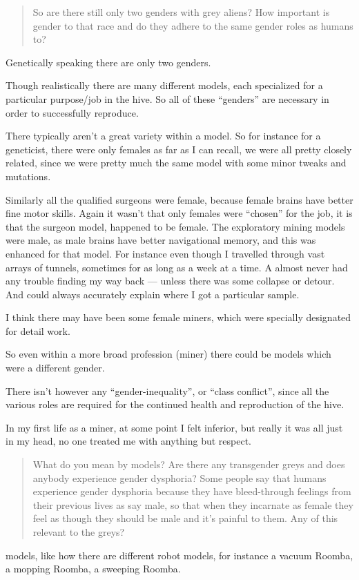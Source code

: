 \blockquote{So are there still only two genders with grey aliens? How important
is gender to that race and do they adhere to the same gender roles as humans
to?}

Genetically speaking there are only two genders.

Though realistically there are many different models, each specialized for a
particular purpose/job in the hive. So all of these ``genders'' are necessary in
order to successfully reproduce.

There typically aren't a great variety within a model. So for instance for a
geneticist, there were only females as far as I can recall, we were all pretty
closely related, since we were pretty much the same model with some minor tweaks
and mutations.

Similarly all the qualified surgeons were female, because female brains have
better fine motor skills. Again it wasn't that only females were ``chosen'' for
the job, it is that the surgeon model, happened to be female. The exploratory
mining models were male, as male brains have better navigational memory, and
this was enhanced for that model. For instance even though I travelled through
vast arrays of tunnels, sometimes for as long as a week at a time. A almost
never had any trouble finding my way back --- unless there was some collapse or
detour. And could always accurately explain where I got a particular sample.

I think there may have been some female miners, which were specially designated
for detail work.

So even within a more broad profession (miner) there could be models which were
a different gender.

There isn't however any ``gender-inequality'', or ``class conflict'', since all the
various roles are required for the continued health and reproduction of the
hive.

In my first life as a miner, at some point I felt inferior, but really it was
all just in my head, no one treated me with anything but respect.

\blockquote{What do you mean by models? Are there any transgender greys and does
anybody experience gender dysphoria? Some people say that humans experience
gender dysphoria because they have bleed-through feelings from their previous
lives as say male, so that when they incarnate as female they feel as though
they should be male and it's painful to them. Any of this relevant to the
greys?}

models, like how there are different robot models, for instance a vacuum Roomba,
a mopping Roomba, a sweeping Roomba.

